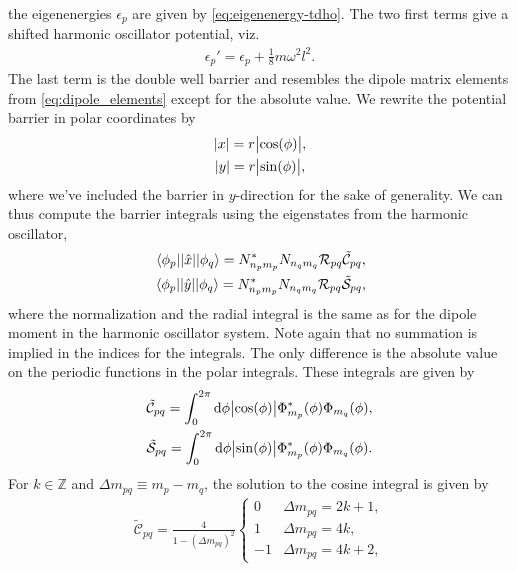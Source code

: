         the eigenenergies $\epsilon_p$ are given by
        \autoref{eq:eigenenergy-tdho}.
        The two first terms give a shifted harmonic oscillator potential, viz.
        \begin{align}
            \epsilon_p' = \epsilon_p + \frac{1}{8} m \omega^2 l^2.
        \end{align}
        The last term is the double well barrier and resembles the dipole matrix
        elements from \autoref{eq:dipole_elements} except for the absolute
        value.
        We rewrite the potential barrier in polar coordinates by
        \begin{gather}
            \abs{x} = r\abs{\cos(\phi)}, \\
            \abs{y} = r\abs{\sin(\phi)},
        \end{gather}
        where we've included the barrier in $y$-direction for the sake of
        generality.
        We can thus compute the barrier integrals using the eigenstates from the
        harmonic oscillator,
        \begin{gather}
            \mel*{\phi_p}{\abs{\position}}{\phi_q}
            =
            N^{*}_{n_p m_p} N_{n_q m_q}
            \mathcal{R}_{pq} \tilde{\mathcal{C}}_{pq},
            \\
            \mel*{\phi_p}{\abs{\position[y]}}{\phi_q}
            =
            N^{*}_{n_p m_p} N_{n_q m_q}
            \mathcal{R}_{pq} \tilde{\mathcal{S}}_{pq},
        \end{gather}
        where the normalization and the radial integral is the same as for the
        dipole moment in the harmonic oscillator system.
        Note again that no summation is implied in the indices for the
        integrals.
        The only difference is the absolute value on the periodic functions in
        the polar integrals.
        These integrals are given by
        \begin{gather}
            \tilde{\mathcal{C}}_{pq}
            =
            \int_{0}^{2\pi} \dd \phi
            \abs{\cos(\phi)}
            \Phi^{*}_{m_p}(\phi)
            \Phi_{m_q}(\phi),
            \\
            \tilde{\mathcal{S}}_{pq}
            =
            \int_{0}^{2\pi} \dd \phi
            \abs{\sin(\phi)}
            \Phi^{*}_{m_p}(\phi)
            \Phi_{m_q}(\phi).
        \end{gather}
        For $k \in \mathbb{Z}$ and $\Delta m_{pq} \equiv m_p - m_q$, the
        solution to the cosine integral is given by
        \begin{align}
            \tilde{\mathcal{C}}_{pq}
            =
            \frac{4}{1 - (\Delta m_{pq})^2}
            \begin{cases}
                0 & \Delta m_{pq} = 2k + 1, \\
                1 & \Delta m_{pq} = 4k, \\
                -1 & \Delta m_{pq} = 4k + 2,
            \end{cases}
        \end{align}

